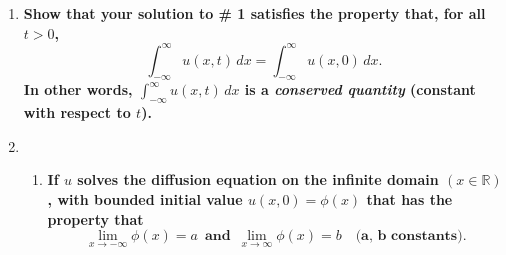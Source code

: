 \documentclass[11pt]{article}
\newenvironment{solution}
  {\renewcommand\qedsymbol{$\blacksquare$}\begin{proof}[Solution]}
  {\end{proof}}
\begin{document}
\begin{enumerate}
\begin{solution}
Factoring out a $e^{-\frac{x^2 \cdot \frac{t}{t+1}}{4t}} = e^{-\frac{x^2}{4(t+1)}}$ term from the integrand, we get that
\[ u(x, t) = \frac{1}{\sqrt{4\pi t}} e^{-\frac{x^2}{4(t+1)}}\int_{-\infty}^{\infty} e^{-\frac{(t+1)\left(y-\frac{x}{t+1}\right)^2}{4t}}\, dy \]

We will now make a substitution to transform the integrand into $e^{-r^2}$: let \[r = \frac{\left(y-\frac{x}{t+1}\right)\sqrt{t+1}}{\sqrt{4t}}.\]
Then we also have that \[ dr = \frac{\sqrt{t+1}}{\sqrt{4t}} \, dy. \]

Making the substitution for $r$ in our solution $u(x, t)$, we find that 
\begin{align*} u(x, t) &= \frac{1}{\sqrt{4\pi t}} e^{-\frac{x^2}{4(t+1)}}\int_{y = -\infty}^{y = \infty} e^{-\frac{(t+1)\left(y-\frac{x}{t+1}\right)^2}{4t}}\, dy \\
&= \frac{1}{\sqrt{\pi(t+1)}} e^{-\frac{x^2}{4(t+1)}} \int_{r = -\infty}^{r = \infty} e^{-r^2} \, dr. \end{align*}

But we also know that $\int_{-\infty}^{\infty} e^{-r^2} \, dr = \sqrt{\pi}$, so plugging this back into our solution, we find that
\begin{align*} u(x, t) &= \frac{1}{\sqrt{\pi(t+1)}} e^{-\frac{x^2}{4(t+1)}} \int_{r = -\infty}^{r = \infty} e^{-r^2} \, dr \\
&= \left(\frac{1}{\sqrt{\pi(t+1)}} e^{-\frac{x^2}{4(t+1)}}\right) \cdot \sqrt{\pi} \\
&= \frac{1}{\sqrt{t+1}} e^{-\frac{x^2}{4(t+1)}}. \end{align*}

Thus, our solution to the given diffusion PDE with the given initial value is
\[ \boxed{u(x, t) = \frac{1}{\sqrt{t+1}} e^{-\frac{x^2}{4(t+1)}}.}\]
	

\end{solution}



\item \textbf{Show that your solution to \# 1 satisfies the property that, for all $t > 0$,}
\[ \int_{-\infty}^{\infty} u(x, t) \, dx = \int_{-\infty}^{\infty} u(x, 0) \, dx.  \]
\textbf{In other words, $\int_{-\infty}^{\infty} u(x, t) \, dx$ is a \textit{conserved quantity} (constant with respect to $t$). }

\item \begin{enumerate}
	
\item \textbf{If $u$ solves the diffusion equation on the infinite domain $(x \in \mathbb{R})$, with bounded initial value $u(x, 0) = \phi(x)$ that has the property that}
\[ \lim_{x \rightarrow -\infty} \phi(x) = a \, \, \, \textbf{and} \, \, \, \lim_{x \rightarrow \infty} \phi(x) = b \, \, \, \, \, \,\textbf{(a, b constants)}.\]


\end{enumerate}
\end{enumerate}
\end{document}
